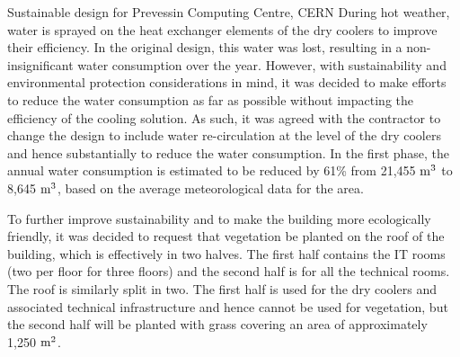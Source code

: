 \documentclass[../SustainableHEP.tex]{subfiles}
\begin{document}
\begin{bestpractice}{Sustainable design for Prevessin Computing Centre, CERN}
During hot weather, water is sprayed on the heat exchanger elements of
the dry coolers to improve their efficiency. In the original design, this
water was lost, resulting in a non-insignificant water consumption over
the year. However, with sustainability and environmental protection
considerations in mind, it was decided to make efforts to reduce the
water consumption as far as possible without impacting the efficiency of
the cooling solution. As such, it was agreed with the contractor to
change the design to include water re-circulation at the level of the dry
coolers and hence substantially to reduce the water consumption. In the
first phase, the annual water consumption is estimated to be reduced by 61\% from
21,455 ${\rm m}^3$ to 8,645 ${\rm m}^3$, based on the average meteorological data for the area.

To further improve sustainability and to make the building more
ecologically friendly, it was decided to request that vegetation be
planted on the roof of the building, which is effectively in two halves.
The first half contains the IT rooms (two per floor for three floors) and
the second half is for all the technical rooms. The roof is similarly
split in two. The first half is used for the dry coolers and associated
technical infrastructure and hence cannot be used for vegetation, but
the second half will be planted with grass covering an area of
approximately 1,250 ${\rm m}^2$.
\end{bestpractice}
\end{document}
